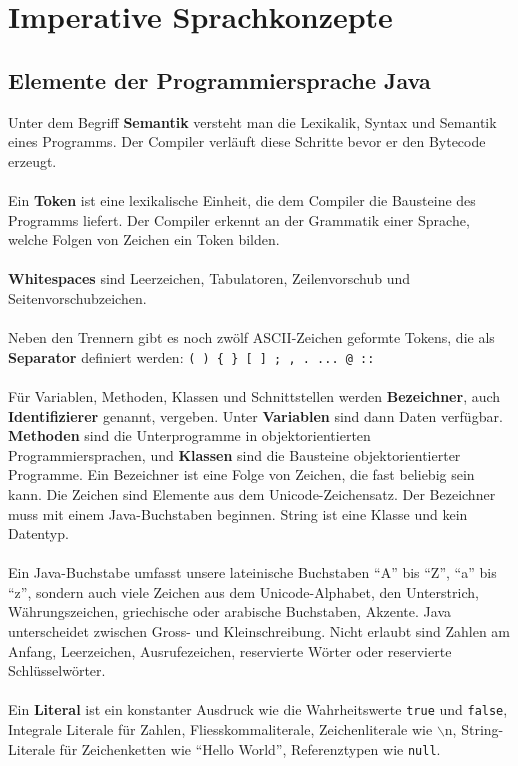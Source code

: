 \section{Imperative Sprachkonzepte}
\subsection{Elemente der Programmiersprache Java}
Unter dem Begriff \textbf{Semantik} versteht man die Lexikalik, Syntax und Semantik eines Programms. Der Compiler verläuft diese Schritte bevor er den Bytecode erzeugt.
\\\\
Ein \textbf{Token} ist eine lexikalische Einheit, die dem Compiler die Bausteine des Programms liefert. Der Compiler erkennt an der Grammatik einer Sprache, welche Folgen von Zeichen ein Token bilden.
\\\\
\textbf{Whitespaces} sind Leerzeichen, Tabulatoren, Zeilenvorschub und Seitenvorschubzeichen.
\\\\
Neben den Trennern gibt es noch zwölf ASCII-Zeichen geformte Tokens, die als \textbf{Separator} definiert werden: \texttt{( ) \{ \} [ ] ; , . ... @ ::}
\\\\
Für Variablen, Methoden, Klassen und Schnittstellen werden \textbf{Bezeichner}, auch \textbf{Identifizierer} genannt, vergeben. Unter \textbf{Variablen} sind dann Daten verfügbar. \textbf{Methoden} sind die Unterprogramme in objektorientierten Programmiersprachen, und \textbf{Klassen} sind die Bausteine objektorientierter Programme. Ein Bezeichner ist eine Folge von Zeichen, die fast beliebig sein kann. Die Zeichen sind Elemente aus dem Unicode-Zeichensatz. Der Bezeichner muss mit einem Java-Buchstaben beginnen. String ist eine Klasse und kein Datentyp.
\\\\
Ein Java-Buchstabe umfasst unsere lateinische Buchstaben ``A'' bis ``Z'', ``a'' bis ``z'', sondern auch viele Zeichen aus dem Unicode-Alphabet, den Unterstrich, Währungszeichen, griechische oder arabische Buchstaben, Akzente. Java unterscheidet zwischen Gross- und Kleinschreibung. Nicht erlaubt sind Zahlen am Anfang, Leerzeichen, Ausrufezeichen, reservierte Wörter oder reservierte Schlüsselwörter.
\\\\
Ein \textbf{Literal} ist ein konstanter Ausdruck wie die Wahrheitswerte \texttt{true} und \texttt{false}, Integrale Literale für Zahlen, Fliesskommaliterale, Zeichenliterale wie $\backslash$n, String-Literale für Zeichenketten wie ``Hello World'', Referenztypen wie \texttt{null}.
